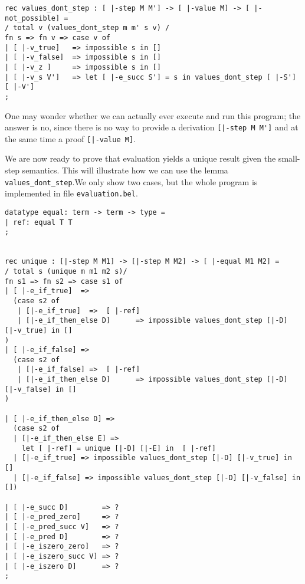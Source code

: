 \begin{lstlisting}
rec values_dont_step : [ |-step M M'] -> [ |-value M] -> [ |-not_possible] =
/ total v (values_dont_step m m' s v) /
fn s => fn v => case v of
| [ |-v_true]   => impossible s in []
| [ |-v_false]  => impossible s in []
| [ |-v_z ]     => impossible s in []
| [ |-v_s V']   => let [ |-e_succ S'] = s in values_dont_step [ |-S'] [ |-V']
;
\end{lstlisting}

One may wonder whether we can actually ever execute and run this program; the
answer is no, since there is no way to provide a derivation
\lstinline![|-step M M']! and at the same time a proof \lstinline![|-value M]!.


We are now ready to prove that evaluation yields a unique result given the
small-step semantics. This will illustrate how we can use the lemma \lstinline!values_dont_step!.We only show two cases, but the whole program is
implemented in file \lstinline!evaluation.bel!.

\begin{lstlisting}
datatype equal: term -> term -> type =
| ref: equal T T
;


rec unique : [|-step M M1] -> [|-step M M2] -> [ |-equal M1 M2] =
/ total s (unique m m1 m2 s)/
fn s1 => fn s2 => case s1 of
| [ |-e_if_true]  =>
  (case s2 of
   | [|-e_if_true]  =>  [ |-ref]
   | [|-e_if_then_else D]      => impossible values_dont_step [|-D] [|-v_true] in []
)
| [ |-e_if_false] =>
  (case s2 of
   | [|-e_if_false] =>  [ |-ref]
   | [|-e_if_then_else D]      => impossible values_dont_step [|-D] [|-v_false] in []
)

| [ |-e_if_then_else D] =>
  (case s2 of
  | [|-e_if_then_else E] =>
    let [ |-ref] = unique [|-D] [|-E] in  [ |-ref]
  | [|-e_if_true] => impossible values_dont_step [|-D] [|-v_true] in []
  | [|-e_if_false] => impossible values_dont_step [|-D] [|-v_false] in [])

| [ |-e_succ D]        => ?
| [ |-e_pred_zero]     => ?
| [ |-e_pred_succ V]   => ?
| [ |-e_pred D]        => ?
| [ |-e_iszero_zero]   => ?
| [ |-e_iszero_succ V] => ?
| [ |-e_iszero D]      => ?
;
\end{lstlisting}

